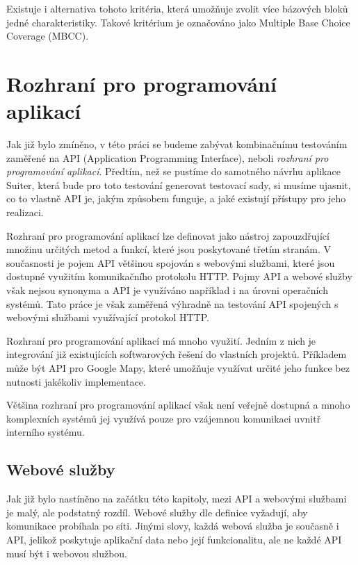 Existuje i alternativa tohoto kritéria, která umožňuje zvolit více bázových bloků jedné charakteristiky. Takové kritérium je označováno jako Multiple Base Choice Coverage (MBCC).

\chapter{Rozhraní pro programování aplikací} 
\label{ch_API}

Jak již bylo zmíněno, v této práci se budeme zabývat kombinačnímu testováním zaměřené na API (Application Programming Interface), neboli \textit{rozhraní pro programování aplikací}. Předtím, než se pustíme do samotného návrhu aplikace Suiter, která bude pro toto testování generovat testovací sady, si musíme ujasnit, co to vlastně API je, jakým způsobem funguje, a jaké existují přístupy pro jeho realizaci. %

Rozhraní pro programování aplikací lze definovat jako nástroj zapouzdřující množinu určitých metod a funkcí, které jsou poskytované třetím stranám. V současnosti je pojem API většinou spojován s webovými službami, které jsou dostupné využitím komunikačního protokolu HTTP. Pojmy API a webové služby však nejsou synonyma a API je využíváno například i na úrovni operačních systémů. Tato práce je však zaměřená výhradně na testování API spojených s webovými službami využívající protokol HTTP. 

Rozhraní pro programování aplikací má mnoho využití. Jedním z nich je integrování již existujících softwarových řešení do vlastních projektů. Příkladem může být API pro Google Mapy, které umožňuje využívat určité jeho funkce bez nutnosti jakékoliv implementace. 

Většina rozhraní pro programování aplikací však není veřejně dostupná a mnoho komplexních systémů jej využívá pouze pro vzájemnou komunikaci uvnitř interního systému.


\section{Webové služby}
\label{sec_webove sluzby}
Jak již bylo nastíněno na začátku této kapitoly, mezi API a webovými službami je malý, ale podstatný rozdíl. Webové služby dle definice vyžadují, aby komunikace probíhala po síti. Jinými slovy, každá webová služba je současně i API, jelikož poskytuje aplikační data nebo její funkcionalitu, ale ne každé API musí být i webovou službou. 

